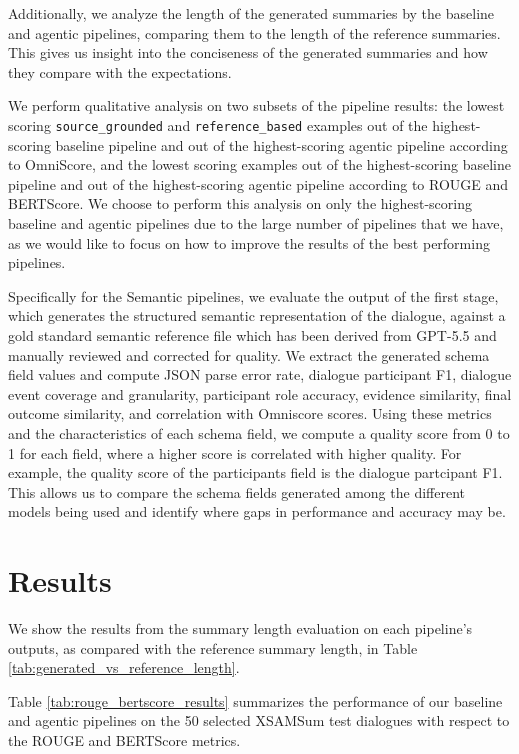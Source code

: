 \documentclass[11pt]{article}
\begin{document}
Additionally, we analyze the length of the generated summaries by the baseline and agentic pipelines, comparing them to the length of the reference summaries. This gives us insight into the conciseness of the generated summaries and how they compare with the expectations.

We perform qualitative analysis on two subsets of the pipeline results: the lowest scoring \texttt{source\_grounded} and \texttt{reference\_based} examples out of the highest-scoring baseline pipeline and out of the highest-scoring agentic pipeline according to OmniScore, and the lowest scoring examples out of the highest-scoring baseline pipeline and out of the highest-scoring agentic pipeline according to ROUGE and BERTScore. We choose to perform this analysis on only the highest-scoring baseline and agentic pipelines due to the large number of pipelines that we have, as we would like to focus on how to improve the results of the best performing pipelines.

Specifically for the Semantic pipelines, we evaluate the output of the first stage, which generates the structured semantic representation of the dialogue, against a gold standard semantic reference file which has been derived from GPT-5.5 \cite{ChatGPT:5.5} and manually reviewed and corrected for quality. We extract the generated schema field values and compute JSON parse error rate, dialogue participant F1, dialogue event coverage and granularity, participant role accuracy, evidence similarity, final outcome similarity, and correlation with Omniscore scores. Using these metrics and the characteristics of each schema field, we compute a quality score from 0 to 1 for each field, where a higher score is correlated with higher quality. For example, the quality score of the participants field is the dialogue partcipant F1. This allows us to compare the schema fields generated among the different models being used and identify where gaps in performance and accuracy may be.

\section{Results}
We show the results from the summary length evaluation on each pipeline's outputs, as compared with the reference summary length, in Table \ref{tab:generated_vs_reference_length}.

Table \ref{tab:rouge_bertscore_results} summarizes the performance of our baseline and agentic pipelines on the 50 selected XSAMSum test dialogues with respect to the ROUGE and BERTScore metrics.
\end{document}
